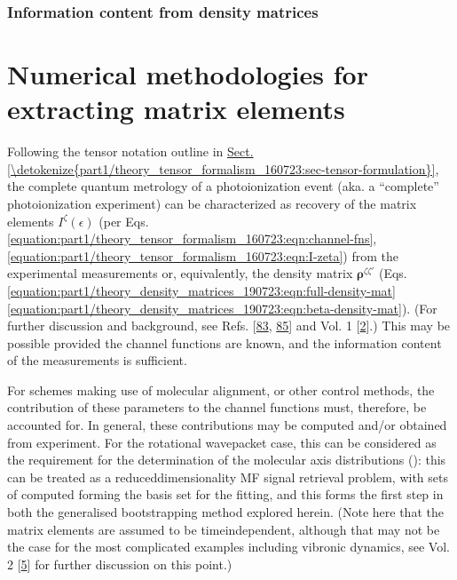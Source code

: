 \documentclass[letterpaper,table,10pt,english]{jupyterBook}
\begin{document}
\subsection{Information content from density matrices}
\label{\detokenize{part1/theory_info_content_221122:information-content-from-density-matrices}}
\sphinxstepscope


\chapter{Numerical methodologies for extracting matrix elements}
\label{\detokenize{part1/numerics_070723:numerical-methodologies-for-extracting-matrix-elements}}\label{\detokenize{part1/numerics_070723:chpt-numerical-details}}\label{\detokenize{part1/numerics_070723::doc}}
\sphinxAtStartPar
Following the tensor notation outline in \hyperref[\detokenize{part1/theory_tensor_formalism_160723:sec-tensor-formulation}]{Sect.\@ \ref{\detokenize{part1/theory_tensor_formalism_160723:sec-tensor-formulation}}}, the complete quantum metrology of a photoionization event (aka. a “complete” photoionization experiment) can be characterized as recovery of the matrix elements \(I^{\zeta}(\epsilon)\) (per Eqs. \eqref{equation:part1/theory_tensor_formalism_160723:eqn:channel-fns}, \eqref{equation:part1/theory_tensor_formalism_160723:eqn:I-zeta}) from the experimental measurements or, equivalently, the density matrix \(\mathbf{\rho}^{\zeta\zeta'}\) (Eqs. \eqref{equation:part1/theory_density_matrices_190723:eqn:full-density-mat} \sphinxhyphen{} \eqref{equation:part1/theory_density_matrices_190723:eqn:beta-density-mat}). (For further discussion and background, see Refs. {[}\hyperlink{cite.backmatter/bibliography:id822}{83}, \hyperlink{cite.backmatter/bibliography:id708}{85}{]} and  Vol. 1 {[}\hyperlink{cite.backmatter/bibliography:id663}{2}{]}.) This may be possible provided the channel functions are known, and the information content of the measurements is sufficient.

\sphinxAtStartPar
For schemes making use of molecular alignment, or other control methods, the contribution of these parameters to the channel functions must, therefore, be accounted for. In general, these contributions may be computed and/or obtained from experiment. For the rotational wavepacket case, this can be considered as the requirement for the determination of the molecular axis distributions ({\hyperref[\detokenize{backmatter/glossary:term-ADMs}]{}}): this can be treated as a reduced\sphinxhyphen{}dimensionality MF signal retrieval problem, with sets of computed {\hyperref[\detokenize{backmatter/glossary:term-ADMs}]{}} forming the basis set for the fitting, and this forms the first step in both the generalised bootstrapping method explored herein. (Note here that the matrix elements are assumed to be time\sphinxhyphen{}independent, although that may not be the case for the most complicated examples including vibronic dynamics, see  Vol. 2 {[}\hyperlink{cite.backmatter/bibliography:id664}{5}{]} for further discussion on this point.)
\end{document}
